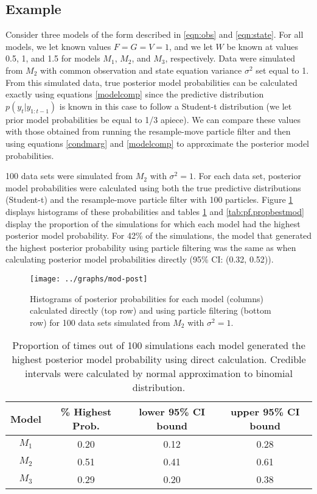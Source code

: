 \documentclass{article}
\begin{document}
\subsection{Example}

Consider three models of the form described in \eqref{eqn:obs} and \eqref{eqn:state}. For all models, we let known values $F = G = V = 1$, and we let $W$ be known at values 0.5, 1, and 1.5 for models $M_1$, $M_2$, and $M_3$, respectively. Data were simulated from $M_2$ with common observation and state equation variance $\sigma^2$ set equal to 1. From this simulated data, true posterior model probabilities can be calculated exactly using equations \eqref{modelcomp} since the predictive distribution $p(y_t|y_{1:t-1})$ is known in this case to follow a Student-t distribution (we let prior model probabilities be equal to 1/3 apiece). We can compare these values with those obtained from running the resample-move particle filter and then using equations \eqref{condmarg} and \eqref{modelcomp} to approximate the posterior model probabilities.

100 data sets were simulated from $M_2$ with $\sigma^2 = 1$. For each data set, posterior model probabilities were calculated using both the true predictive distributions (Student-t) and the resample-move particle filter with 100 particles. Figure \ref{fig:probhist} displays histograms of these probabilities and tables \ref{tab:true.propbestmod} and \ref{tab:pf.propbestmod} display the proportion of the simulations for which each model had the highest posterior model probability. For 42\% of the simulations, the model that generated the highest posterior probability using particle filtering was the same as when calculating posterior model probabilities directly (95\% CI: (0.32, 0.52)).

\clearpage

\begin{figure}
\texttt{[image: ../graphs/mod-post]}
\caption{Histograms of posterior probabilities for each model (columns) calculated directly (top row) and using particle filtering (bottom row) for 100 data sets simulated from $M_2$ with $\sigma^2 = 1$.} \label{fig:probhist}
\end{figure}

\begin{table}
\begin{center}
\caption{Proportion of times out of 100 simulations each model generated the highest posterior model probability using direct calculation. Credible intervals were calculated by normal approximation to binomial distribution.} \label{tab:true.propbestmod}
\begin{tabular}{|c|c|c|c|}
\hline
 Model & \% Highest Prob. & lower 95\% CI bound & upper 95\% CI bound \\
 \hline
 $M_1$ & 0.20 & 0.12 & 0.28 \\
 $M_2$ & 0.51 & 0.41 & 0.61 \\
 $M_3$ & 0.29 & 0.20 & 0.38 \\
 \hline
\end{tabular}
\end{center}
\end{table}
\end{document}
